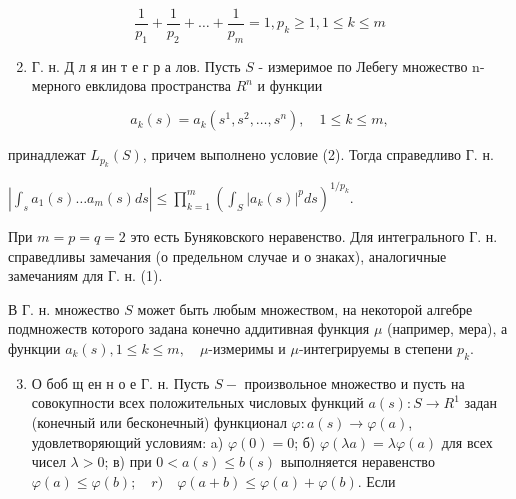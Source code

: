 \documentclass[10pt]{article}
\begin{document}
\[

\frac{1}{p_{1}}+\frac{1}{p_{2}}+\ldots+\frac{1}{p_{m}}=1, p_{k} \geqslant 1,1 \leqslant k \leqslant m

\]



\begin{enumerate}

  \setcounter{enumi}{1}

  \item Г. н. Д л я ин т е г р а лов. Пусть $S$ - измеримое по Лебегу множество n-мерного евклидова пространства $R^{n}$ и функции

\end{enumerate}



\[

a_{k}(s)=a_{k}\left(s^{1}, s^{2}, \ldots, s^{n}\right), \quad 1 \leqslant k \leqslant m,

\]



принадлежат $L_{p_{k}}(S)$, причем выполнено условие (2). Тогда справедливо Г. н.



$\left|\int_{s} a_{1}(s) \ldots a_{m}(s) d s\right| \leqslant \prod_{k=1}^{m}\left(\int_{S}\left|a_{k}(s)\right|^{p} d s\right)^{1 / p_{k}}$.



При $m=p=q=2$ это есть Буняковского неравенство. Для интегрального Г. н. справедливы замечания (о предельном случае и о знаках), аналогичные замечаниям для Г. н. (1).



В Г. н. множество $S$ может быть любым множеством, на некоторой алгебре подмножеств которого задана конечно аддитивная функция $\mu$ (например, мера), а функции $a_{k}(s), 1 \leqslant k \leqslant m, \quad \mu$-измеримы и $\mu$-интегрируемы в степени $p_{k}$.



\begin{enumerate}

  \setcounter{enumi}{2}

  \item О боб щ ен н о е $Г$. н. Пусть $S-$ произвольное множество и пусть на совокупности всех положительных числовых функций $a(s): S \rightarrow R^{1}$ задан (конечный или бесконечный) функционал $\varphi: a(s) \rightarrow \varphi(a)$, удовлетворяющий условиям: a) $\varphi(0)=0$; б) $\varphi(\lambda a)=\lambda \varphi(a)$ для всех чисел $\lambda>0$; в) при $0<a(s) \leqslant b(s)$ выполняется неравенство $\varphi(a) \leqslant \varphi(b) ; \quad r) \quad \varphi(a+b) \leqslant \varphi(a)+\varphi(b)$. Если

\end{enumerate}
\end{document}
